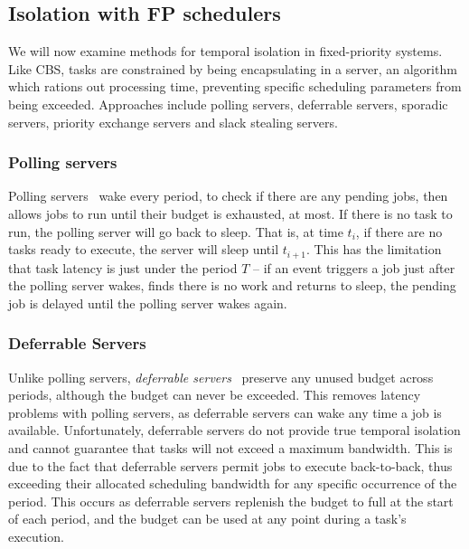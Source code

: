 \subsection{Isolation with FP schedulers}
\label{background:fp-isolation}

We will now
examine methods for temporal isolation in fixed-priority systems. 
Like \gls{CBS}, tasks are constrained by being encapsulating in a server, an algorithm which
rations out processing time, preventing specific scheduling parameters from being exceeded.
Approaches include polling servers, deferrable servers, sporadic servers, priority exchange servers
and slack stealing servers. 


\subsubsection{Polling servers}
\label{p:polling-servers}

Polling servers~\citep{Lehoczky_LS_87} wake every period,
to check if there are any pending jobs, then allows jobs to run until their budget is exhausted, at most. If there is no
task to run, the polling server will go back to sleep. That is, at time $t_{i}$, if there are no
tasks ready to execute, the server will sleep until $t_{i+1}$. This has the limitation that task latency
is just under the period $T$ -- if an event triggers a job just after the polling server wakes,
finds there is no work and returns to sleep, the pending job is delayed until the polling server
wakes again. 

\subsubsection{Deferrable Servers}
\label{p:ds} 

Unlike polling servers, \emph{deferrable
servers}~\citep{Lehoczky_LS_87, Strosnider_LS_95} preserve any unused budget across periods, although
the budget can never be exceeded.  This removes latency problems with polling servers, as deferrable
servers can wake any time a job is available. Unfortunately, deferrable servers do not provide 
true temporal isolation and cannot guarantee that tasks will not exceed a maximum bandwidth. 
This is due to the fact that deferrable servers permit jobs to execute back-to-back, thus exceeding their allocated scheduling bandwidth for any specific occurrence of
the period.  This occurs as deferrable servers replenish the budget to full at the start of each
period, and the budget can be used at any point during a task's execution. 

